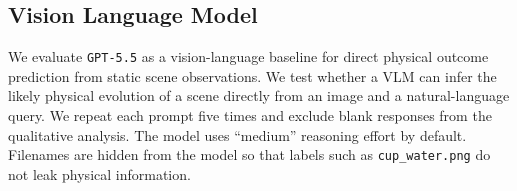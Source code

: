 \documentclass{article}
\begin{document}


\subsection{Vision Language Model}

We evaluate \texttt{GPT-5.5} as a vision-language baseline for direct physical outcome prediction from static scene observations. We test whether a VLM can infer the likely physical evolution of a scene directly from an image and a natural-language query.
We repeat each prompt five times and exclude blank responses from the qualitative analysis. The model uses ``medium'' reasoning effort by default. Filenames are hidden from the model so that labels such as \texttt{cup\_water.png} do not leak physical information.
\end{document}
